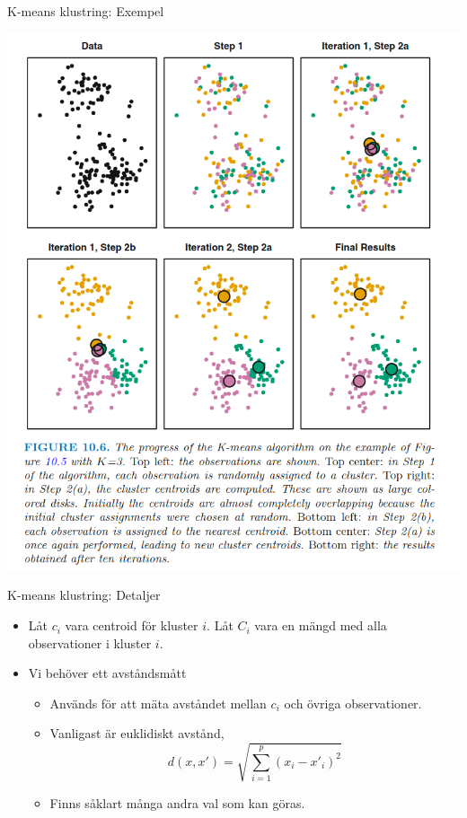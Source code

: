 \documentclass[10pt,english]{beamer}
\begin{document}
\begin{frame}{K-means klustring: Exempel}

    \includegraphics[scale=0.26]{figs/k-means Illustration2.png}
    
\end{frame}

\begin{frame}{K-means klustring: Detaljer}

    \begin{itemize}
        \item Låt $c_i$ vara centroid för kluster $i$. Låt $C_i$ vara en mängd med alla observationer i kluster $i$.
        \item Vi behöver ett avståndsmått
        \begin{itemize}
            \item Används för att mäta avståndet mellan $c_i$ och övriga observationer.
            \item Vanligast är euklidiskt avstånd,
            \begin{equation*}
                d(x,x') = \sqrt{\sum_{i=1}^{p}(x_i - x'_i)^2}
            \end{equation*}
            \item Finns såklart många andra val som kan göras.
        \end{itemize}
    \end{itemize}
    
\end{frame}
\end{document}
